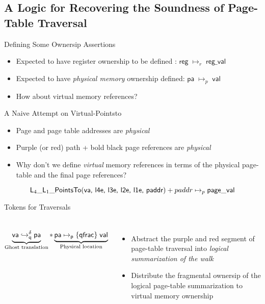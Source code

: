 \documentclass[aspectratio=169,xcolor=dvipsnames]{beamer}
\newcommand{\fracghostmaptoken}[4]{\ensuremath{#2\hookrightarrow^{#1}_{#4}#3}}
\newcommand{\vale}{\textsf{val}}
\begin{document}
\subsection{A Logic for Recovering the Soundness of Page-Table Traversal}
\begin{frame}{Defining Some Ownersip Assertions}
    \begin{itemize}
    \item   Expected to have register ownership to be defined : $\mathsf{reg} \; \mapsto_{r} \; \mathsf{reg\_val}$
        \item Expected to have \emph{physical memory} ownership defined: $\mathsf{pa} \; \mapsto_{p} \; \mathsf{val}$
        \item How about virtual memory references?
    \end{itemize}
\end{frame}
\begin{frame}{A Naive Attempt on Virtual-Pointsto}
    \begin{itemize}
        \item Page and page table addresses are \emph{physical}
        \item Purple (or red) path + bold black page references are \emph{physical}
        \item Why don't we define \emph{virtual} memory references in terms of the physical page-table and the final page references? 
    \end{itemize}
      \[ \textsf{L}_{4}\_\textsf{L}_{1}\_\textsf{PointsTo}(\mathsf{va}\textsf{, l4e, l3e, l2e, l1e, paddr}) + paddr \mapsto_{p} \mathsf{page\_val}\]
%
%
\end{frame}
\begin{frame}{Tokens for Traversals} \scriptsize
    \begin{columns}
\[        \underbrace{\fracghostmaptoken{\delta}{\vaddr}{\paddr}{\qfrac} }_\text{Ghost translation} \ast \underbrace{\paddr \mapsto_{\mathsf{p}}\{\textsf{qfrac}\}\; \vale}_\text{Physical location} \]
        \begin{itemize}
            \item Abstract the purple and red segment of page-table traversal into \emph{logical summarization of the walk}
            \item Distribute the fragmental ownersip of the logical page-table summarization to virtual memory ownership
        \end{itemize}
    \end{columns}
\end{frame}
\end{document}
